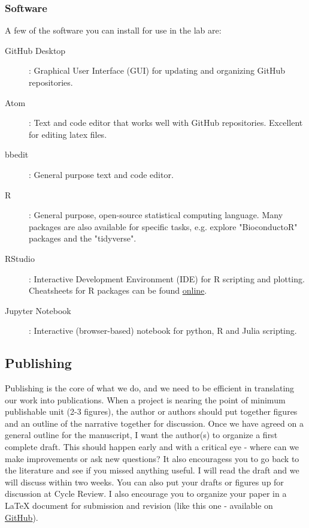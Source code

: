 \documentclass[10pt, letterpaper, twocolumn]{article} %
\begin{document}
\subsubsection{Software}
A few of the software you can install for use in the lab are:
\begin{description}
\item [GitHub Desktop]: Graphical User Interface (GUI) for updating and organizing GitHub repositories.
\item [Atom]: Text and code editor that works well with GitHub repositories. Excellent for editing latex files.
\item [bbedit]: General purpose text and code editor.
\item [R]: General purpose, open-source statistical computing language. Many packages are also available for specific tasks, e.g. explore "BioconductoR" packages and the "tidyverse".
\item [RStudio]: Interactive Development Environment (IDE) for R scripting and plotting. Cheatsheets for R packages can be found \href{https://www.rstudio.com/resources/cheatsheets/}{online}.
\item [Jupyter Notebook]: Interactive (browser-based) notebook for python, R and Julia scripting.
\end{description}

\subsection{Publishing}
Publishing is the core of what we do, and we need to be efficient in translating our work into publications. When a project is nearing the point of minimum publishable unit (2-3 figures), the author or authors should put together figures and an outline of the narrative together for discussion. Once we have agreed on a general outline for the manuscript, I want the author(s) to organize a first complete draft. This should happen early and with a critical eye - where can we make improvements or ask new questions? It also encouragess you to go back to the literature and see if you missed anything useful. I will read the draft and we will discuss within two weeks. You can also put your drafts or figures up for discussion at Cycle Review. I also encourage you to organize your paper in a LaTeX document for submission and revision (like this one - available on \href{https://github.com/QVEU/QVEU/blob/main/ExpectationsDocument/main.tex}{GitHub}).
\end{document}

